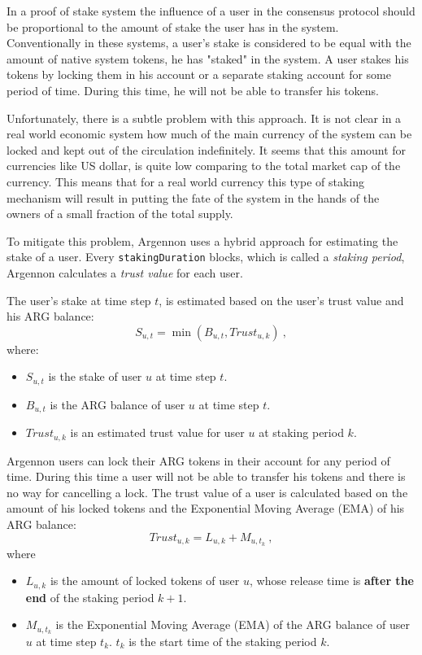 In a proof of stake system the influence of a user in the consensus protocol should be proportional to the amount
of stake the user has in the system. Conventionally in these systems, a user's stake is considered to be equal with the
amount of native system tokens, he has "staked" in the system. A user stakes his tokens by locking them in
his account or a separate staking account for some period of time. During this time, he will not be able to transfer
his tokens.

Unfortunately, there is a subtle problem with this approach. It is not clear in a real world economic system
how much of the main currency of the system can be locked and kept out of the circulation indefinitely. It seems that
this amount for currencies like US dollar, is quite low comparing to the total market cap of the currency.
This means that for a real world currency this type of staking mechanism will result in putting the
fate of the system in the hands of the owners of a small fraction of the total supply.

To mitigate this problem, Argennon uses a hybrid approach for estimating the stake of a user.
Every \texttt{stakingDuration} blocks, which is called a \emph{staking period}, Argennon calculates
a \emph{trust value} for each user.

The user's stake
at time step \(t\), is estimated based on the user's trust value and his ARG balance:
\begin{equation}
    S_{u,t} = \min (B_{u,t}, Trust_{u,k})\ ,\label{eq:stake}
\end{equation}
where:
\begin{itemize}
    \item \(S_{u,t}\) is the stake of user \(u\) at time step \(t\).
    \item \(B_{u,t}\) is the ARG balance of user \(u\) at time step \(t\).
    \item \(Trust_{u,k}\) is an estimated trust value for user \(u\) at staking period \(k\).
\end{itemize}

Argennon users can lock their ARG tokens in their account for any period of time. During this time a user
will not be able to transfer his tokens and there is no way for cancelling a lock.
The trust value of a user is calculated based on the amount of his locked tokens and the
Exponential Moving Average (EMA) of his ARG balance:
\begin{equation}
    Trust_{u,k} = L_{u,k} + M_{u,t_k}\ ,\label{eq:trust}
\end{equation}
where
\begin{itemize}
    \item $L_{u,k}$ is the amount of locked tokens of user $u$, whose release time is \textbf{after the end} of
    the staking period $k+1$.
    \item $M_{u,t_k}$ is the Exponential Moving Average (EMA) of the ARG balance of user \(u\) at time step \(t_k\).
    $t_k$ is the start time of the staking period $k$.
\end{itemize}

